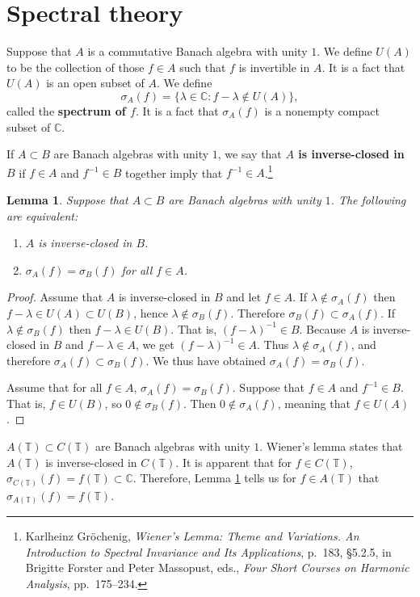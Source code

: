 \documentclass{article}
\newtheorem{lemma}[theorem]{Lemma}
\theoremstyle{definition}
\begin{document}
\section{Spectral theory}
Suppose that $A$ is a commutative Banach algebra with unity $1$. We define $U(A)$ to be the collection of 
those $f \in A$ such that $f$ is invertible in $A$. It is a fact that $U(A)$ is an open subset of $A$.  We define
\[
\sigma_A(f) = \{\lambda \in \mathbb{C}: f-\lambda \not \in U(A) \},
\]
called the \textbf{spectrum of $f$}. It is a fact that $\sigma_A(f)$ is a nonempty compact subset of $\mathbb{C}$.

If $A \subset B$ are Banach algebras with unity $1$, we say that \textbf{$A$ is inverse-closed in $B$} if
$f \in A$ and $f^{-1} \in B$ together imply that $f^{-1} \in A$.\footnote{Karlheinz Gr\"ochenig,
{\em Wiener's Lemma: Theme and Variations. An Introduction to
Spectral Invariance and Its Applications}, p.~183, \S 5.2.5, in Brigitte Forster and Peter Massopust, eds., {\em Four Short Courses on Harmonic Analysis}, pp.~175--234.}

\begin{lemma}
Suppose that $A \subset B$ are Banach algebras with unity $1$. The following are equivalent:
\begin{enumerate}
\item $A$ is inverse-closed in $B$.
\item $\sigma_A(f)=\sigma_B(f)$ for all $f \in A$. 
\end{enumerate}
\label{inverseclosed}
\end{lemma}
\begin{proof}
Assume that $A$ is inverse-closed in $B$ and let $f \in A$. If $\lambda \not \in \sigma_A(f)$ then
$f-\lambda  \in U(A) \subset U(B)$, hence $\lambda \not \in \sigma_B(f)$. Therefore
$\sigma_B(f) \subset \sigma_A(f)$. If $\lambda \not \in \sigma_B(f)$ then
$f-\lambda \in U(B)$. That is, $(f-\lambda)^{-1} \in B$. Because $A$ is inverse-closed in $B$
and $f-\lambda \in A$, we get $(f-\lambda)^{-1} \in A$. Thus $\lambda \not \in \sigma_A(f)$, and therefore
$\sigma_A(f) \subset \sigma_B(f)$. We thus have obtained $\sigma_A(f)=\sigma_B(f)$.

Assume that for all $f \in A$, $\sigma_A(f)=\sigma_B(f)$. Suppose that
$f \in A$ and $f^{-1} \in B$. That is, $f \in U(B)$, so $0 \not \in \sigma_B(f)$.
Then $0 \not \in \sigma_A(f)$, meaning that $f \in U(A)$.
\end{proof}

$A(\mathbb{T}) \subset C(\mathbb{T})$ are Banach algebras with unity $1$. 
Wiener's lemma states that $A(\mathbb{T})$ is inverse-closed in $C(\mathbb{T})$. 
It is apparent that for $f \in C(\mathbb{T})$, $\sigma_{C(\mathbb{T})}(f)=f(\mathbb{T}) \subset \mathbb{C}$.
Therefore, Lemma \ref{inverseclosed} tells us for $f \in A(\mathbb{T})$ that
$\sigma_{A(\mathbb{T})}(f)=f(\mathbb{T})$.
\end{document}
